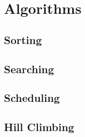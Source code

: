 \chapter{Algorithms}

\section{Sorting}

\section{Searching}

\section{Scheduling}

\section{Hill Climbing}
